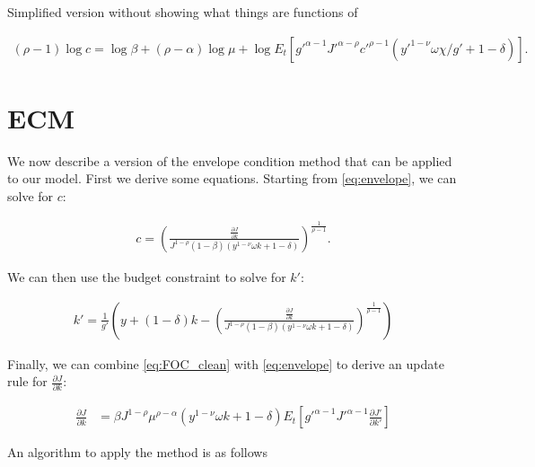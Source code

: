 \documentclass[10pt]{article}
\newcommand{\fracpd}[2]{
  \ensuremath{\frac{\partial #1}{\partial #2}}
}
\newcommand{\pfrac}[2]{
  \ensuremath{ \left( \frac{#1}{#2} \right)}
}
\begin{document}
Simplified version without showing what things are functions of

\begin{align*}
  (\rho - 1)\log c =\log \beta + (\rho-  \alpha) \log \mu + \log E_t \left[ g'^{\alpha-1} J'^{\alpha - \rho} c'^{\rho - 1} (y'^{1 - \nu} \omega \chi/g' + 1 - \delta)  \right].
\end{align*}

\section{ECM}

We now describe a version of the envelope condition method that can be applied
to our model. First we derive some equations. Starting from \eqref{eq:envelope}, we
can solve for $c$:

\begin{align} \label{eq:c_from_env}
  c = \pfrac{\fracpd{J}{k}}{J^{1-\rho}(1 - \beta) (y^{1-\nu} \omega k + 1 - \delta)}^{\frac{1}{\rho-1}}.
\end{align}

We can then use the budget constraint to solve for $k'$:

\begin{align}
  \label{eq:k_from_bc}
  k' = \frac{1}{g'} \left( y + (1 - \delta)k -  \pfrac{\fracpd{J}{k}}{J^{1-\rho}(1 - \beta) (y^{1-\nu} \omega k + 1 - \delta)}^{\frac{1}{\rho-1}} \right)
\end{align}


Finally, we can combine \eqref{eq:FOC_clean} with \eqref{eq:envelope} to derive
an update rule for $\fracpd{J}{k}$:

\begin{align}
  \label{eq:j_k_update}
  \fracpd{J}{k} &= \beta J^{1-\rho} \mu^{\rho - \alpha} (y^{1-\nu} \omega k + 1 - \delta) E_t \left[ g'^{\alpha - 1}J'^{\alpha - 1} \fracpd{J'}{k'} \right]
\end{align}

An algorithm to apply the method is as follows
\end{document}
